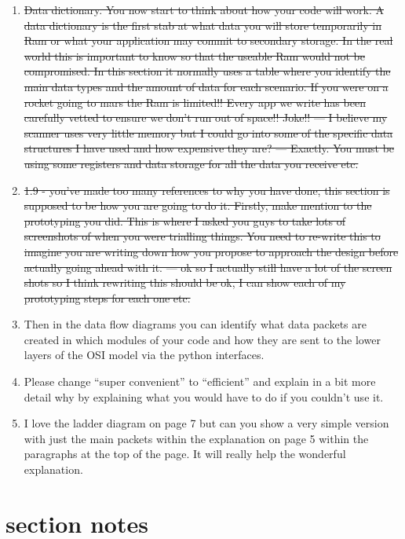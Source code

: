 \documentclass{article}
\begin{document}
\begin{enumerate}
  \item{\sout{Data dictionary. You now start to think about how your code will work. A data dictionary is the first stab at what data you will store temporarily in Ram or what your application may commit to secondary storage. In the real world this is important to know so that the useable Ram would not be  compromised.  In this section it normally uses a table where you identify the main data types and the amount of data for each scenario. If you were on a rocket going to mars the Ram is limited!! Every app we write has been carefully vetted to ensure we don’t run out of space!! Joke!! --- I believe my scanner uses very little memory but I could go into some of the specific data structures I have used and how expensive they are? --- Exactly. You must be using some registers and data storage for all the data you receive etc.}}
  \item{\sout{1.9 - you’ve made too many references to why you have done, this section is supposed to be how you are going to do it. Firstly, make mention to the prototyping you did. This is where I asked you guys to take lots of screenshots of when you were trialling things. You need to re-write this to imagine you are writing down how you propose to approach the design before actually going ahead with it. --- ok so I actually still have a lot of the screen shots so I think rewriting this should be ok, I can show each of my prototyping steps for each one etc.}}
  \item{Then in the data flow diagrams you can identify what data packets are created in which modules of your code and how they are sent to the lower layers of the OSI model via the python interfaces.}


  \item{Please change “super convenient” to “efficient” and explain in a bit more detail why by explaining what you would have to do if you couldn’t use it.}

  \item{I love the ladder diagram on page 7 but can you show a very simple version with just the main packets within the explanation on page 5 within the paragraphs at the top of the page. It will really help the wonderful explanation.}

\end{enumerate}

\section{section notes}
\end{document}

